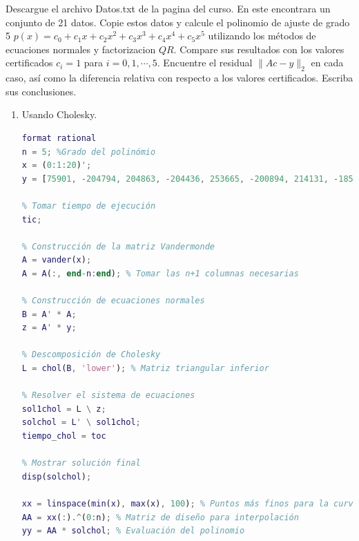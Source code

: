 \begin{homeworkProblem}
  Descargue el archivo Datos.txt de la pagina del curso. En este encontrara un conjunto de 21 datos. Copie estos datos y calcule el polinomio de ajuste de grado 5 $p(x)=c_0+c_1x+c_2x^2+c_3x^3+c_4x^4+c_5x^5$ utilizando los métodos de ecuaciones normales y factorizacion $QR$. Compare sus resultados con los valores certificados $c_i=1$ para $i=0,1,\cdots,5$. Encuentre el residual $\|Ac-y\|_2$ en cada caso, así como la diferencia relativa con respecto a los valores certificados. Escriba sus conclusiones.
  \begin{solucion}
    \begin{enumerate}
      \item Usando Cholesky.\\
        \begin{lstlisting}[language = matlab]
format rational
n = 5; %Grado del polinómio
x = (0:1:20)';
y = [75901, -204794, 204863, -204436, 253665, -200894, 214131, -185192, 221249, -138370, 315911, -27644, 455253, 197434, 783995, 608816, 1370781, 1303798, 2205519, 2408860, 3444321]';

% Tomar tiempo de ejecución
tic;

% Construcción de la matriz Vandermonde
A = vander(x);
A = A(:, end-n:end); % Tomar las n+1 columnas necesarias

% Construcción de ecuaciones normales
B = A' * A;
z = A' * y;

% Descomposición de Cholesky
L = chol(B, 'lower'); % Matriz triangular inferior

% Resolver el sistema de ecuaciones
sol1chol = L \ z;      
solchol = L' \ sol1chol;
tiempo_chol = toc

% Mostrar solución final
disp(solchol);

xx = linspace(min(x), max(x), 100); % Puntos más finos para la curva
AA = xx(:).^(0:n); % Matriz de diseño para interpolación
yy = AA * solchol; % Evaluación del polinomio


\end{lstlisting}
\end{enumerate}
\end{solucion}
\end{homeworkProblem}

